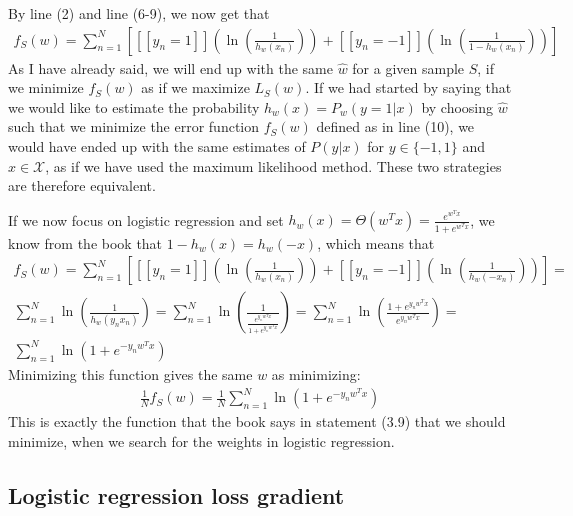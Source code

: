 By line (2) and line (6-9), we now get that
\begin{align}
f_S(w) = \sum_{n=1}^N \left[ [[y_n = 1]]\left(\ln \left( \frac{1}{h_w(x_n)}\right)\right) + [[y_n = -1]]\left(\ln \left( \frac{1}{1 - h_w(x_n)}\right)\right) \right]
\end{align}
As I have already said, we will end up with the same $\hat{w}$ for a given sample $S$, if we minimize $f_S(w)$ as if we maximize $L_S(w)$. If we had started by saying that we would like to estimate the probability $h_w(x) = P_w(y = 1|x)$ by choosing $\hat{w}$ such that we minimize the error function $f_S(w)$ defined as in line (10), we would have ended up with the same estimates of $P(y|x)$ for $y \in \{-1,1\}$ and $x\in \mathcal{X}$, as if we have used the maximum likelihood method. These two strategies are therefore equivalent.

If we now focus on logistic regression and set $h_w(x) = \Theta(w^T x) = \frac{e^{w^Tx}}{1 + e^{w^Tx}}$, we know from the book that $1 - h_w(x) = h_w(-x)$, which means that
\begin{align}
f_S(w) = \sum_{n=1}^N \left[ [[y_n = 1]]\left(\ln \left( \frac{1}{h_w(x_n)}\right)\right) + [[y_n = -1]]\left(\ln \left( \frac{1}{h_w(-x_n)}\right)\right) \right] = \\
 \sum_{n=1}^N  \ln \left( \frac{1}{h_w(y_nx_n)}\right)  = \sum_{n=1}^N  \ln \left( \frac{1}{\frac{e^{y_nw^Tx}}{1 + e^{y_ nw^Tx}}}\right)  = \sum_{n=1}^N  \ln \left( \frac{1 + e^{y_ nw^Tx}}{e^{y_ nw^Tx}}\right)  = \\
 \sum_{n=1}^N  \ln \left( 1 +e^{-y_ nw^Tx}\right)
\end{align}
Minimizing this function gives the same $w$ as minimizing:
\begin{align}
\frac{1}{N}f_S(w) = \frac{1}{N} \sum_{n=1}^N  \ln \left( 1 +e^{-y_ nw^Tx}\right)
\end{align}
This is exactly the function that the book says in statement (3.9) that we should minimize, when we search for the weights in logistic regression.

\subsection{Logistic regression loss gradient}

